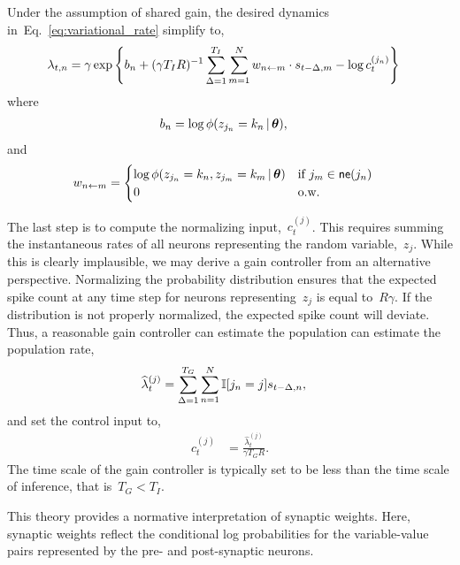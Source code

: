 Under the assumption of shared gain, the
desired dynamics in~Eq.~\ref{eq:variational_rate}
simplify to,
\begin{align}
  \label{eq:mf_log_probs}
  \lambda_{t,n} &= \gamma
  \exp \left \{b_n + (\gamma T_I R)^{-1} \sum_{\Delta=1}^{T_I} \sum_{m=1}^N w_{n \leftarrow m} \cdot s_{t-\Delta,m}
  - \log c_t^{(j_n)} \right \}
\end{align}
where
\begin{align}
  b_n &= \log \phi(z_{j_n} = k_n \,|\, \boldsymbol{\theta}),
\end{align}
and
\begin{align}
  w_{n \leftarrow m} &=
  \begin{cases}
    \log \phi(z_{j_n}=k_n, z_{j_m}=k_m \,|\, \boldsymbol{\theta}) & \text{if }j_m
    \in \mathsf{ne}(j_n) \\
    0 & \text{o.w.}
  \end{cases}
\end{align}


The last step is to compute the normalizing input,~$c_t^{(j)}$.
This requires summing the instantaneous rates of all neurons representing the
random variable,~$z_j$. While this is clearly implausible, we may derive
a gain controller from an alternative perspective. Normalizing the
probability distribution ensures that the expected spike count at
any time step for
neurons representing~$z_j$ is equal to~$R\gamma$. If the distribution
is not properly normalized, the expected spike count will deviate.
Thus, a reasonable gain controller can estimate the population
can estimate the population rate,
\begin{align}
\widehat{\lambda}_{t}^{(j)} &= \sum_{\Delta = 1}^{T_G} \sum_{n=1}^N \mathbb{I}[j_n=j] s_{t-\Delta, n},
\end{align}
and set the control input to,
\begin{align}
  c_{t}^{(j)} &= \frac{\widehat{\lambda}_{t}^{(j)}}{\gamma T_G R}.
\end{align}
The time scale of the gain controller is typically set to be
less than the time scale of inference, that is~$T_G < T_I$.


This theory provides a normative interpretation of synaptic weights.
Here, synaptic weights reflect the conditional log probabilities
for the variable-value pairs represented by the pre- and post-synaptic
neurons. 

